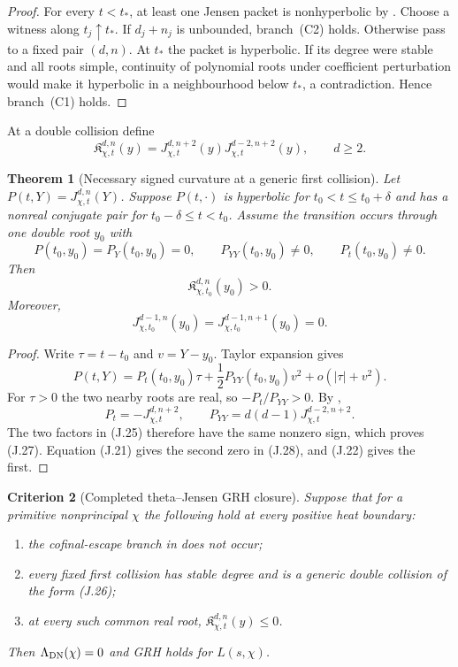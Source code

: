 \documentclass[11pt]{article}
\newtheorem{theorem}{Theorem}[section]
\newtheorem{criterion}[theorem]{Criterion}
\theoremstyle{definition}
\theoremstyle{remark}
\begin{document}
\begin{proof}
For every $t<t_*$, at least one Jensen packet is nonhyperbolic by
.  Choose a witness along
$t_j\uparrow t_*$.  If $d_j+n_j$ is unbounded, branch~\textup{(C2)} holds.
Otherwise pass to a fixed pair $(d,n)$.  At $t_*$ the packet is hyperbolic.
If its degree were stable and all roots simple, continuity of polynomial
roots under coefficient perturbation would make it hyperbolic in a
neighbourhood below $t_*$, a contradiction.  Hence branch~\textup{(C1)}
holds.
\end{proof}

At a double collision define
\[
 \mathfrak K_{\chi,t}^{d,n}(y)
 =J_{\chi,t}^{d,n+2}(y)
  J_{\chi,t}^{d-2,n+2}(y),
 \qquad d\ge2.
 \tag{J.25}
\]

\begin{theorem}[Necessary signed curvature at a generic first collision]
\label{thm:theta-collision-sign}
Let $P(t,Y)=J_{\chi,t}^{d,n}(Y)$.  Suppose $P(t,\cdot)$ is hyperbolic for
$t_0<t\le t_0+\delta$ and has a nonreal conjugate pair for
$t_0-\delta\le t<t_0$.  Assume the transition occurs through one double root
$y_0$ with
\[
 P(t_0,y_0)=P_Y(t_0,y_0)=0,
 \qquad P_{YY}(t_0,y_0)\ne0,
 \qquad P_t(t_0,y_0)\ne0.
 \tag{J.26}
\]
Then
\[
 \boxed{\mathfrak K_{\chi,t_0}^{d,n}(y_0)>0.}
 \tag{J.27}
\]
Moreover,
\[
 J_{\chi,t_0}^{d-1,n}(y_0)
 =J_{\chi,t_0}^{d-1,n+1}(y_0)=0.
 \tag{J.28}
\]
\end{theorem}

\begin{proof}
Write $\tau=t-t_0$ and $v=Y-y_0$.  Taylor expansion gives
\[
 P(t,Y)=P_t(t_0,y_0)\tau
 +\frac12P_{YY}(t_0,y_0)v^2+o(|\tau|+v^2).
\]
For $\tau>0$ the two nearby roots are real, so
$-P_t/P_{YY}>0$.  By ,
\[
 P_t=-J_{\chi,t}^{d,n+2},
 \qquad
 P_{YY}=d(d-1)J_{\chi,t}^{d-2,n+2}.
\]
The two factors in \textup{(J.25)} therefore have the same nonzero sign,
which proves \textup{(J.27)}.  Equation \textup{(J.21)} gives the second
zero in \textup{(J.28)}, and \textup{(J.22)} gives the first.
\end{proof}

\begin{criterion}[Completed theta--Jensen GRH closure]
\label{crit:theta-Jensen-GRH}
Suppose that for a primitive nonprincipal $\chi$ the following hold at every
positive heat boundary:
\begin{enumerate}[label=\textup{(T\arabic*)},leftmargin=3.2em]
\item the cofinal-escape branch in
       does not occur;
\item every fixed first collision has stable degree and is a generic double
      collision of the form \textup{(J.26)};
\item at every such common real root,
      $\mathfrak K_{\chi,t}^{d,n}(y)\le0$.
\end{enumerate}
Then $\Lambda_{\rm DN}(\chi)=0$ and GRH holds for $L(s,\chi)$.
\end{criterion}
\end{document}
